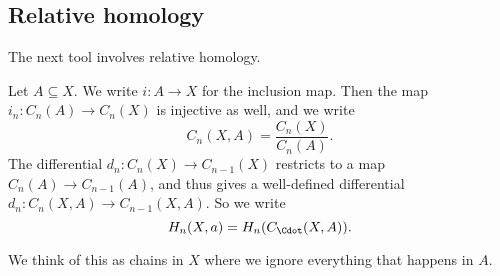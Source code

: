 \documentclass[a4paper]{article}
\begin{document}
\subsection{Relative homology}
The next tool involves relative homology.
\begin{defi}
  Let $A \subseteq X$. We write $i: A \to X$ for the inclusion map. Then the map $i_n: C_n(A) \to C_n(X)$ is injective as well, and we write
  \[
    C_n(X, A) = \frac{C_n(X)}{C_n(A)}.
  \]
  The differential $d_n: C_n(X) \to C_{n - 1}(X)$ restricts to a map $C_n(A) \to C_{n - 1}(A)$, and thus gives a well-defined differential $d_n: C_n(X, A) \to C_{n - 1}(X, A)$. So we write
  \[
    H_n(X, a) = H_n(C_{\Cdot}(X, A)).
  \]
\end{defi}
We think of this as chains in $X$ where we ignore everything that happens in $A$.
\printindex
\end{document}
